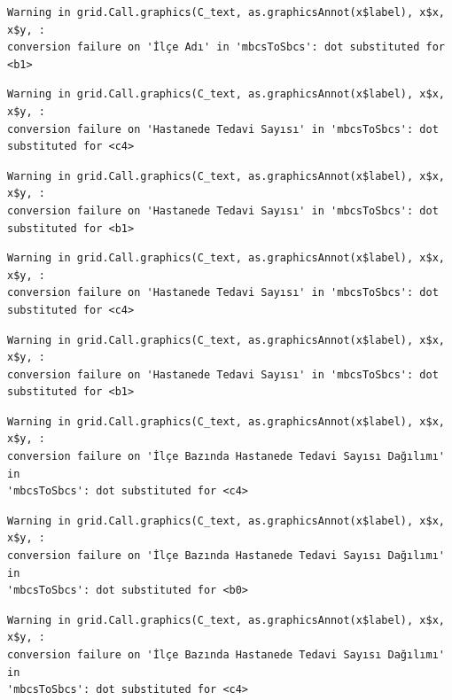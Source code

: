\documentclass[
  11pt,
  a4paper,
  DIV=11,
  numbers=noendperiod]{scrartcl}
\begin{document}
\begin{verbatim}
Warning in grid.Call.graphics(C_text, as.graphicsAnnot(x$label), x$x, x$y, :
conversion failure on 'İlçe Adı' in 'mbcsToSbcs': dot substituted for <b1>
\end{verbatim}

\begin{verbatim}
Warning in grid.Call.graphics(C_text, as.graphicsAnnot(x$label), x$x, x$y, :
conversion failure on 'Hastanede Tedavi Sayısı' in 'mbcsToSbcs': dot
substituted for <c4>
\end{verbatim}

\begin{verbatim}
Warning in grid.Call.graphics(C_text, as.graphicsAnnot(x$label), x$x, x$y, :
conversion failure on 'Hastanede Tedavi Sayısı' in 'mbcsToSbcs': dot
substituted for <b1>
\end{verbatim}

\begin{verbatim}
Warning in grid.Call.graphics(C_text, as.graphicsAnnot(x$label), x$x, x$y, :
conversion failure on 'Hastanede Tedavi Sayısı' in 'mbcsToSbcs': dot
substituted for <c4>
\end{verbatim}

\begin{verbatim}
Warning in grid.Call.graphics(C_text, as.graphicsAnnot(x$label), x$x, x$y, :
conversion failure on 'Hastanede Tedavi Sayısı' in 'mbcsToSbcs': dot
substituted for <b1>
\end{verbatim}

\begin{verbatim}
Warning in grid.Call.graphics(C_text, as.graphicsAnnot(x$label), x$x, x$y, :
conversion failure on 'İlçe Bazında Hastanede Tedavi Sayısı Dağılımı' in
'mbcsToSbcs': dot substituted for <c4>
\end{verbatim}

\begin{verbatim}
Warning in grid.Call.graphics(C_text, as.graphicsAnnot(x$label), x$x, x$y, :
conversion failure on 'İlçe Bazında Hastanede Tedavi Sayısı Dağılımı' in
'mbcsToSbcs': dot substituted for <b0>
\end{verbatim}

\begin{verbatim}
Warning in grid.Call.graphics(C_text, as.graphicsAnnot(x$label), x$x, x$y, :
conversion failure on 'İlçe Bazında Hastanede Tedavi Sayısı Dağılımı' in
'mbcsToSbcs': dot substituted for <c4>
\end{verbatim}
\end{document}
